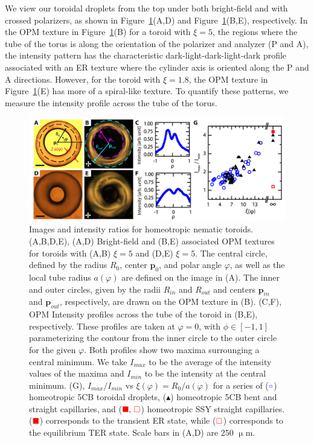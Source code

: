 We view our toroidal droplets from the top under both bright-field and with crossed polarizers, as shown in Figure~\ref{f:4-HomeoToroidsExp}(A,D) and Figure~\ref{f:4-HomeoToroidsExp}(B,E), respectively.
In the OPM texture in Figure~\ref{f:4-HomeoToroidsExp}(B) for a toroid with $\xi = 5$, the regions where the tube of the torus is along the orientation of the polarizer and analyzer (P and A), the intensity pattern has the characteristic dark-light-dark-light-dark profile associated with an ER texture where the cylinder axis is oriented along the P and A directions.
However, for the toroid with $\xi = 1.8$, the OPM texture in Figure~\ref{f:4-HomeoToroidsExp}(E) has more of a spiral-like texture.
To quantify these patterns, we measure the intensity profile across the tube of the torus.
\begin{figure}
  \centering
  \includegraphics{figures/C4/Ch4-Figs_HomeoToroidsExp.png}
  \caption{Images and intensity ratios for homeotropic nematic toroids.
  (A,B,D,E), (A,D) Bright-field and (B,E) associated OPM textures for toroids with (A,B) $\xi = 5$ and (D,E) $\xi = 5$.
  The central circle, defined by the radius $R_{0}$, center $\mathbf{p}_0$, and polar angle $\varphi$, as well as the local tube radius $a(\varphi)$ are defined on the image in (A).
  The inner and outer circles, given by the radii $R_{in}$ and $R_{out}$ and centers $\mathbf{p}_{in}$ and $\mathbf{p}_{out}$, respectively, are drawn on the OPM texture in (B).
  (C,F), OPM Intensity profiles across the tube of the toroid in (B,E), respectively.
  These profiles are taken at $\varphi = 0$, with $\phi \in [-1,1]$ parameterizing the contour from the inner circle to the outer circle for the given $\varphi$.
  Both profiles show two maxima surrounging a central minimum.
  We take $I_{max}$ to be the average of the intensity values of the maxima and $I_{min}$ to be the intensity at the central minimum.
  (G), $I_{max}/I_{min}$ vs $\xi(\varphi) = R_0/a(\varphi)$ for a series of (${\color{blue} \circ}$) homeotropic 5CB toroidal droplets, (${\blacktriangle}$) homeotropic 5CB bent and straight capillaries, and (${\color{red} \blacksquare},\,{\color{red} \square}$) homeotropic SSY straight capillaries.
     (${\color{red} \blacksquare}$) corresponds to the transient ER state, while (${\color{red} \square}$) corresponds to the equilibrium TER state.
     Scale bars in (A,D) are 250 $\upmu$m.}\label{f:4-HomeoToroidsExp}
\end{figure}


